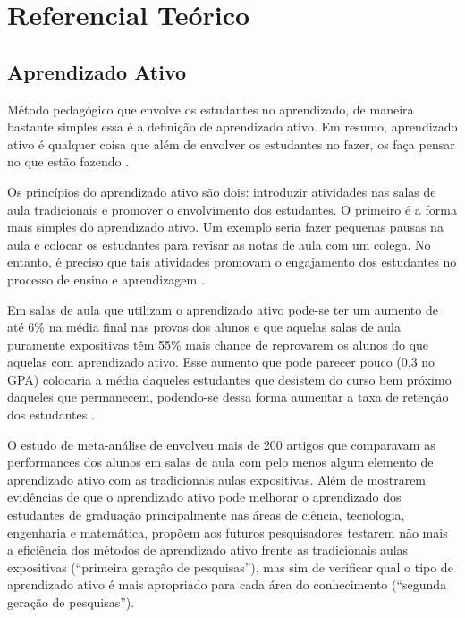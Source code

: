 \chapter{Referencial Teórico}

\section{Aprendizado Ativo}\label{section:aprendizado_ativo}
Método pedagógico que envolve os estudantes no aprendizado, de maneira bastante simples
essa é a definição de aprendizado ativo. Em resumo, aprendizado ativo é qualquer coisa
que além de envolver os estudantes no fazer, os faça pensar no que estão fazendo \cite[p. 19]{Charles1991}.

Os princípios do aprendizado ativo são dois: introduzir atividades nas salas de aula
tradicionais e promover o envolvimento dos estudantes. O primeiro é a forma
mais simples do aprendizado ativo. Um exemplo seria fazer pequenas pausas na aula
e colocar os estudantes para revisar as notas de aula com um colega. No entanto,
é preciso que tais atividades promovam o engajamento dos estudantes no processo
de ensino e aprendizagem \cite[p. 3]{Prince2004}.

Em salas de aula que utilizam o aprendizado ativo pode-se ter um aumento de até 6\%
na média final nas provas dos alunos e que aquelas salas de aula puramente expositivas
têm 55\% mais chance de reprovarem os alunos do que aquelas com aprendizado ativo.
Esse aumento que pode parecer pouco (0,3 no GPA) colocaria a média daqueles estudantes
que desistem do curso bem próximo daqueles que permanecem, podendo-se dessa forma aumentar
a taxa de retenção dos estudantes \cite[p. 4]{Freeman2014}.

O estudo de meta-análise de  envolveu mais de 200 artigos
que comparavam as performances dos alunos em salas de aula com pelo menos algum
elemento de aprendizado ativo com as tradicionais aulas expositivas. Além de
mostrarem evidências de que o aprendizado ativo pode melhorar o aprendizado dos
estudantes de graduação principalmente nas áreas de ciência, tecnologia, engenharia
e matemática,  propõem aos futuros pesquisadores
testarem não mais a eficiência dos métodos de aprendizado ativo frente as tradicionais
aulas expositivas (``primeira geração de pesquisas''), mas sim de verificar qual
o tipo de aprendizado ativo é mais apropriado para cada área do conhecimento
(``segunda geração de pesquisas'').

